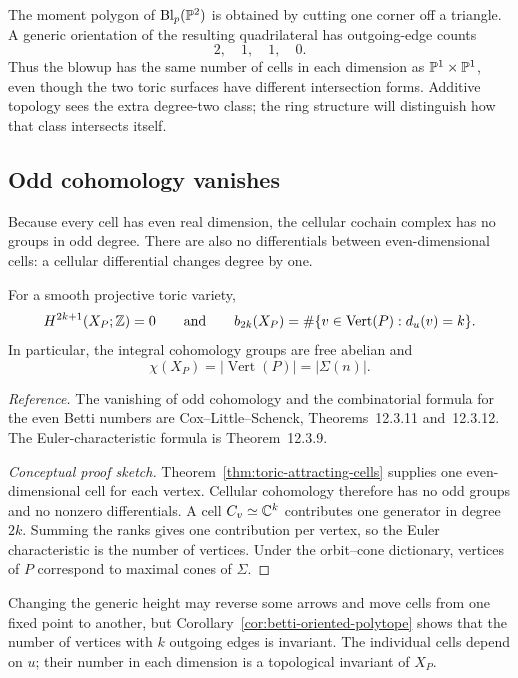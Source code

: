 \begin{example}
The moment polygon of \(\operatorname{Bl}_p(\mathbb{P}^2)\) is obtained by cutting one corner
off a triangle. A generic orientation of the resulting quadrilateral
has outgoing-edge counts
\[
2,\quad1,\quad1,\quad0.
\]
Thus the blowup has the same number of cells in each dimension as
\(\mathbb{P}^1\times\mathbb{P}^1\), even though the two toric surfaces have different
intersection forms. Additive topology sees the extra degree-two class;
the ring structure will distinguish how that class intersects itself.
\end{example}

\subsection{Odd cohomology vanishes}

Because every cell has even real dimension, the cellular cochain
complex has no groups in odd degree. There are also no differentials
between even-dimensional cells: a cellular differential changes degree
by one.

\begin{corollary}
\label{cor:betti-oriented-polytope}
For a smooth projective toric variety,
\[
H^{2k+1}(X_P;\mathbb{Z})=0
\qquad\text{and}\qquad
b_{2k}(X_P)=\#\{v\in\operatorname{Vert}(P):d_u(v)=k\}.
\]
In particular, the integral cohomology groups are free abelian and
\[
\chi(X_P)
=|\operatorname{Vert}(P)|
=|\Sigma(n)|.
\]
\end{corollary}

\noindent
\textit{Reference.}
The vanishing of odd cohomology and the combinatorial formula for the
even Betti numbers are Cox--Little--Schenck, Theorems~12.3.11
and~12.3.12. The Euler-characteristic formula is Theorem~12.3.9.

\begin{proof}[Conceptual proof sketch]
Theorem~\ref{thm:toric-attracting-cells} supplies one even-dimensional
cell for each vertex. Cellular cohomology therefore has no odd groups
and no nonzero differentials. A cell \(C_v\simeq\mathbb{C}^k\) contributes one
generator in degree \(2k\). Summing the ranks gives one contribution per
vertex, so the Euler characteristic is the number of vertices. Under
the orbit--cone dictionary, vertices of \(P\) correspond to maximal
cones of \(\Sigma\).
\end{proof}

\begin{observation}
Changing the generic height may reverse some arrows and move cells from
one fixed point to another, but Corollary~\ref{cor:betti-oriented-polytope}
shows that the number of vertices with \(k\) outgoing edges is invariant.
The individual cells depend on \(u\); their number in each dimension is
a topological invariant of \(X_P\).
\end{observation}

